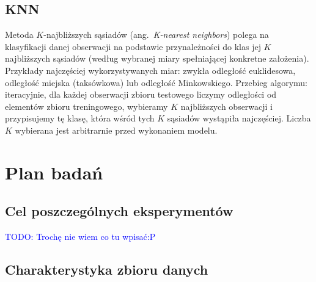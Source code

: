 \documentclass{article}
\newcommand{\TODO}[1]{\textcolor{blue}{TODO: #1}}
\newcommand{\ang}[1]{ang.~{\itshape #1}}
\begin{document}
\subsection{KNN}
Metoda $K$-najbliższych sąsiadów (\ang{K-nearest neighbors}) polega na klasyfikacji danej obserwacji na podstawie przynależności do klas jej $K$ najbliższych sąsiadów (według wybranej miary spełniającej konkretne założenia). Przykłady najczęściej wykorzystywanych miar: zwykła odległość euklidesowa, odległość miejska (taksówkowa) lub odległość Minkowskiego. Przebieg algorymu: iteracyjnie, dla każdej obserwacji zbioru testowego liczymy odległości od elementów zbioru treningowego, wybieramy $K$ najbliższych obserwacji i przypisujemy tę klasę, która wśród tych $K$ sąsiadów wystąpiła najczęściej. Liczba $K$ wybierana jest arbitrarnie przed wykonaniem modelu.

\section{Plan badań}

\subsection{Cel poszczególnych eksperymentów}

\TODO{Trochę nie wiem co tu wpisać:P}

\subsection{Charakterystyka zbioru danych}
\end{document}
